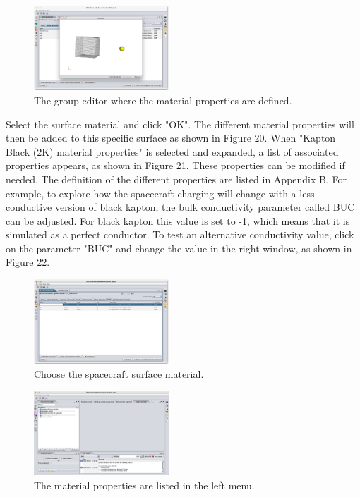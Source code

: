\documentclass[a4paper, 11pt]{article}
\begin{document}
\begin{figure}[!ht]
    \centering
    \includegraphics[width=0.45\textwidth]{fig19.jpg}
    \caption{The group editor where the material properties are defined.}
\end{figure}

Select the surface material and click "OK". The different material properties will then be added to this specific surface as shown in Figure 20. When "Kapton Black (2K) material properties" is selected and expanded, a list of associated properties appears, as shown in Figure 21. These properties can be modified if needed. The definition of the different properties are listed in Appendix B. For example, to explore how the spacecraft charging will change with a less conductive version of black kapton, the bulk conductivity parameter called BUC can be adjusted. For black kapton this value is set to -1, which means that it is simulated as a perfect conductor. To test an alternative conductivity value, click on the parameter "BUC" and change the value in the right window, as shown in Figure 22.

\begin{figure}[!ht]
    \centering
    \includegraphics[width=0.45\textwidth]{fig20.jpg}
    \caption{Choose the spacecraft surface material.}
\end{figure}

\begin{figure}[!ht]
    \centering
    \includegraphics[width=0.45\textwidth]{fig21.jpg}
    \caption{The material properties are listed in the left menu.}
\end{figure}
\end{document}
